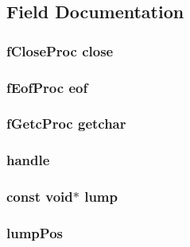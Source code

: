 \subsection{Field Documentation}
\hypertarget{struct_s_i_o_aa179397f07be189ced9425aa6345d44a}{
\subsubsection[{close}]{\setlength{\rightskip}{0pt plus 5cm}f\-Close\-Proc close}}\label{struct_s_i_o_aa179397f07be189ced9425aa6345d44a}
\hypertarget{struct_s_i_o_a03a5e0026ca13d40331e03f11a5a3f96}{
\subsubsection[{eof}]{\setlength{\rightskip}{0pt plus 5cm}f\-Eof\-Proc eof}}\label{struct_s_i_o_a03a5e0026ca13d40331e03f11a5a3f96}
\hypertarget{struct_s_i_o_ad8f9fd8070ae74def9716f2a4132ccc1}{
\subsubsection[{getchar}]{\setlength{\rightskip}{0pt plus 5cm}f\-Getc\-Proc getchar}}\label{struct_s_i_o_ad8f9fd8070ae74def9716f2a4132ccc1}
\hypertarget{struct_s_i_o_ad9abffca31e189317284eccc5d4ccd79}{
\subsubsection[{handle}]{ handle}}\label{struct_s_i_o_ad9abffca31e189317284eccc5d4ccd79}
\hypertarget{struct_s_i_o_a01766410160a2e7119db1f2ed7e07573}{
\subsubsection[{lump}]{\setlength{\rightskip}{0pt plus 5cm}const {\bf void}$\ast$ lump}}\label{struct_s_i_o_a01766410160a2e7119db1f2ed7e07573}
\hypertarget{struct_s_i_o_a70e66ab40cafe546819e082dc829611f}{
\subsubsection[{lump\-Pos}]{ lump\-Pos}}\label{struct_s_i_o_a70e66ab40cafe546819e082dc829611f}
